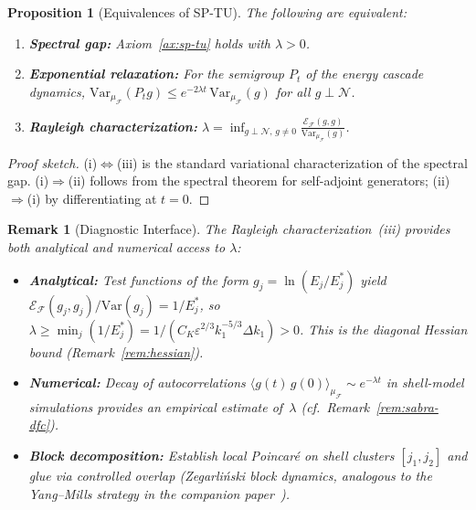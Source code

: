 \documentclass[12pt,a4paper]{article}
\theoremstyle{breakdef}
\theoremstyle{breakplain}
\newtheorem{proposition}[definition]{Proposition}
\theoremstyle{breakdef}
\newtheorem{remark}[definition]{Remark}
\begin{document}
\begin{proposition}[Equivalences of SP-TU]\label{prop:sp-equivalences}
The following are equivalent:
\begin{enumerate}
\item[(i)] \textbf{Spectral gap:} Axiom~\ref{ax:sp-tu} holds with $\lambda > 0$.
\item[(ii)] \textbf{Exponential relaxation:} For the semigroup $P_t$ of the energy cascade dynamics,
  $\mathrm{Var}_{\mu_{\mathcal{F}}}(P_t g) \leq e^{-2\lambda t}\, \mathrm{Var}_{\mu_{\mathcal{F}}}(g)$ for all $g \perp \mathcal{N}$.
\item[(iii)] \textbf{Rayleigh characterization:}
  $\lambda = \inf_{g \perp \mathcal{N},\, g \neq 0} \frac{\mathcal{E}_{\mathcal{F}}(g,g)}{\mathrm{Var}_{\mu_{\mathcal{F}}}(g)}$.
\end{enumerate}
\end{proposition}

\begin{proof}[Proof sketch]
(i)$\Leftrightarrow$(iii) is the standard variational characterization of the spectral gap. (i)$\Rightarrow$(ii) follows from the spectral theorem for self-adjoint generators; (ii)$\Rightarrow$(i) by differentiating at $t=0$.
\end{proof}

\begin{remark}[Diagnostic Interface]\label{rem:sp-diagnostics}
The Rayleigh characterization~(iii) provides both analytical and numerical access to $\lambda$:
\begin{itemize}
\item \textbf{Analytical:} Test functions of the form $g_j = \ln(E_j/E_j^*)$ yield $\mathcal{E}_{\mathcal{F}}(g_j, g_j) / \mathrm{Var}(g_j) = 1/E_j^*$, so $\lambda \geq \min_j (1/E_j^*) = 1/(C_K \varepsilon^{2/3} k_1^{-5/3} \Delta k_1) > 0$. This is the diagonal Hessian bound (Remark~\ref{rem:hessian}).
\item \textbf{Numerical:} Decay of autocorrelations $\langle g(t)\, g(0) \rangle_{\mu_{\mathcal{F}}} \sim e^{-\lambda t}$ in shell-model simulations provides an empirical estimate of~$\lambda$ (cf.\ Remark~\ref{rem:sabra-dfc}).
\item \textbf{Block decomposition:} Establish local Poincaré on shell clusters $[j_1, j_2]$ and glue via controlled overlap (Zegarli\'nski block dynamics, analogous to the Yang--Mills strategy in the companion paper~\cite{Geiger2026-YM}).
\end{itemize}
\end{remark}
\end{document}
